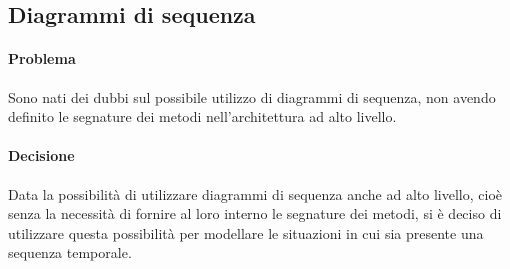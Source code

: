 \subsection{Diagrammi di sequenza}
\paragraph{Problema}
Sono nati dei dubbi sul possibile utilizzo di diagrammi di sequenza, non avendo definito le segnature dei metodi nell'architettura ad alto livello.
\paragraph{Decisione}
Data la possibilità di utilizzare diagrammi di sequenza anche ad alto livello, cioè senza la necessità di fornire al loro interno le segnature dei metodi, si è deciso di utilizzare questa possibilità per modellare le situazioni in cui sia presente una sequenza temporale.
